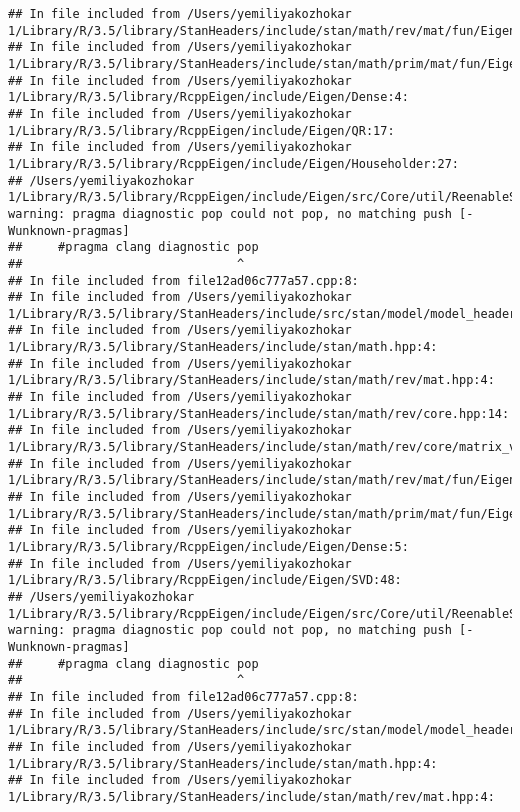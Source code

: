 \documentclass[]{article}
\begin{document}
\begin{verbatim}
## In file included from /Users/yemiliyakozhokar 1/Library/R/3.5/library/StanHeaders/include/stan/math/rev/mat/fun/Eigen_NumTraits.hpp:4:
## In file included from /Users/yemiliyakozhokar 1/Library/R/3.5/library/StanHeaders/include/stan/math/prim/mat/fun/Eigen.hpp:4:
## In file included from /Users/yemiliyakozhokar 1/Library/R/3.5/library/RcppEigen/include/Eigen/Dense:4:
## In file included from /Users/yemiliyakozhokar 1/Library/R/3.5/library/RcppEigen/include/Eigen/QR:17:
## In file included from /Users/yemiliyakozhokar 1/Library/R/3.5/library/RcppEigen/include/Eigen/Householder:27:
## /Users/yemiliyakozhokar 1/Library/R/3.5/library/RcppEigen/include/Eigen/src/Core/util/ReenableStupidWarnings.h:10:30: warning: pragma diagnostic pop could not pop, no matching push [-Wunknown-pragmas]
##     #pragma clang diagnostic pop
##                              ^
## In file included from file12ad06c777a57.cpp:8:
## In file included from /Users/yemiliyakozhokar 1/Library/R/3.5/library/StanHeaders/include/src/stan/model/model_header.hpp:4:
## In file included from /Users/yemiliyakozhokar 1/Library/R/3.5/library/StanHeaders/include/stan/math.hpp:4:
## In file included from /Users/yemiliyakozhokar 1/Library/R/3.5/library/StanHeaders/include/stan/math/rev/mat.hpp:4:
## In file included from /Users/yemiliyakozhokar 1/Library/R/3.5/library/StanHeaders/include/stan/math/rev/core.hpp:14:
## In file included from /Users/yemiliyakozhokar 1/Library/R/3.5/library/StanHeaders/include/stan/math/rev/core/matrix_vari.hpp:4:
## In file included from /Users/yemiliyakozhokar 1/Library/R/3.5/library/StanHeaders/include/stan/math/rev/mat/fun/Eigen_NumTraits.hpp:4:
## In file included from /Users/yemiliyakozhokar 1/Library/R/3.5/library/StanHeaders/include/stan/math/prim/mat/fun/Eigen.hpp:4:
## In file included from /Users/yemiliyakozhokar 1/Library/R/3.5/library/RcppEigen/include/Eigen/Dense:5:
## In file included from /Users/yemiliyakozhokar 1/Library/R/3.5/library/RcppEigen/include/Eigen/SVD:48:
## /Users/yemiliyakozhokar 1/Library/R/3.5/library/RcppEigen/include/Eigen/src/Core/util/ReenableStupidWarnings.h:10:30: warning: pragma diagnostic pop could not pop, no matching push [-Wunknown-pragmas]
##     #pragma clang diagnostic pop
##                              ^
## In file included from file12ad06c777a57.cpp:8:
## In file included from /Users/yemiliyakozhokar 1/Library/R/3.5/library/StanHeaders/include/src/stan/model/model_header.hpp:4:
## In file included from /Users/yemiliyakozhokar 1/Library/R/3.5/library/StanHeaders/include/stan/math.hpp:4:
## In file included from /Users/yemiliyakozhokar 1/Library/R/3.5/library/StanHeaders/include/stan/math/rev/mat.hpp:4:

\end{verbatim}
\end{document}
